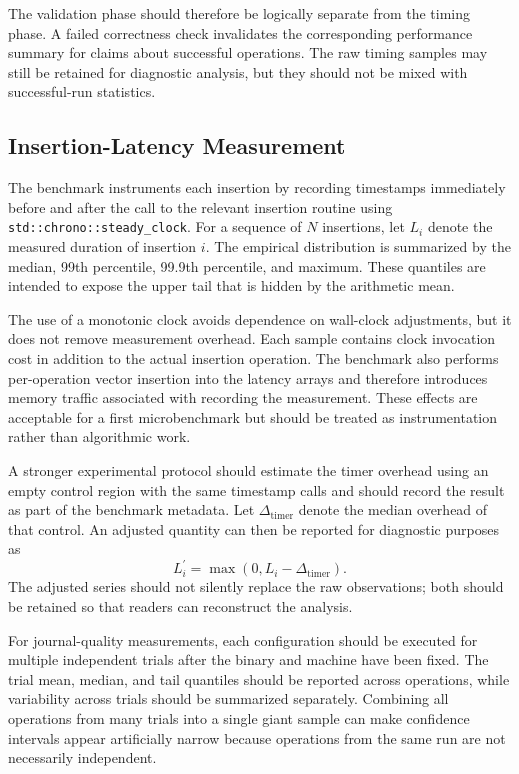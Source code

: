 \documentclass[conference]{IEEEtran}
\begin{document}
The validation phase should therefore be logically separate from the timing
phase. A failed correctness check invalidates the corresponding performance
summary for claims about successful operations. The raw timing samples may
still be retained for diagnostic analysis, but they should not be mixed with
successful-run statistics.

\subsection{Insertion-Latency Measurement}

The benchmark instruments each insertion by recording timestamps immediately
before and after the call to the relevant insertion routine using
\texttt{std::chrono::steady\_clock}. For a sequence of $N$ insertions, let
$L_i$ denote the measured duration of insertion $i$. The empirical distribution
is summarized by the median, 99th percentile, 99.9th percentile, and maximum.
These quantiles are intended to expose the upper tail that is hidden by the
arithmetic mean.

The use of a monotonic clock avoids dependence on wall-clock adjustments, but
it does not remove measurement overhead. Each sample contains clock invocation
cost in addition to the actual insertion operation. The benchmark also performs
per-operation vector insertion into the latency arrays and therefore introduces
memory traffic associated with recording the measurement. These effects are
acceptable for a first microbenchmark but should be treated as instrumentation
rather than algorithmic work.

A stronger experimental protocol should estimate the timer overhead using an
empty control region with the same timestamp calls and should record the result
as part of the benchmark metadata. Let $\Delta_{\mathrm{timer}}$ denote the
median overhead of that control. An adjusted quantity can then be reported for
diagnostic purposes as
\begin{equation}
    L_i^{\prime}=\max\left(0,L_i-\Delta_{\mathrm{timer}}\right).
    \label{eq:timer-adjustment}
\end{equation}
The adjusted series should not silently replace the raw observations; both
should be retained so that readers can reconstruct the analysis.

For journal-quality measurements, each configuration should be executed for
multiple independent trials after the binary and machine have been fixed. The
trial mean, median, and tail quantiles should be reported across operations,
while variability across trials should be summarized separately. Combining all
operations from many trials into a single giant sample can make confidence
intervals appear artificially narrow because operations from the same run are
not necessarily independent.
\end{document}
